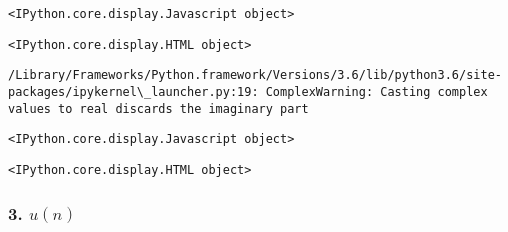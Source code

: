 \documentclass[11pt]{article}
\begin{document}
    
    \begin{verbatim}
<IPython.core.display.Javascript object>
    \end{verbatim}

    
    
    \begin{verbatim}
<IPython.core.display.HTML object>
    \end{verbatim}

    
    \begin{Verbatim}[commandchars=\\\{\}]
/Library/Frameworks/Python.framework/Versions/3.6/lib/python3.6/site-packages/ipykernel\_launcher.py:19: ComplexWarning: Casting complex values to real discards the imaginary part

    \end{Verbatim}

    
    \begin{verbatim}
<IPython.core.display.Javascript object>
    \end{verbatim}

    
    
    \begin{verbatim}
<IPython.core.display.HTML object>
    \end{verbatim}

    
    \hypertarget{un}{%
\subsubsection{\texorpdfstring{3. \(u(n)\)}{3. u(n)}}\label{un}}
\end{document}
